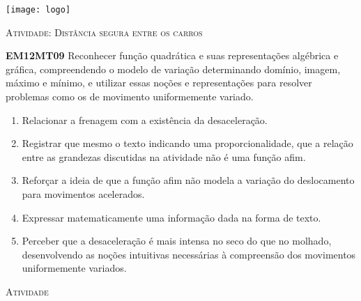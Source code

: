 \documentclass[10 pt,usenames,dvipsnames, oneside]{article}
\begin{document}
\begin{center}
  \begin{minipage}[l]{3cm}
\texttt{[image: logo]}    
\end{minipage}\hfill
\begin{minipage}[r]{.8\textwidth}
 {\Large \scshape Atividade: Distância segura entre os carros}  
\end{minipage}
\end{center}
\vspace{.2cm}

\ifdefined\prof
\begin{objetivos}
\item \textbf{EM12MT09} Reconhecer função quadrática e suas representações algébrica e gráfica, compreendendo o
modelo de variação determinando domínio, imagem, máximo e mínimo, e utilizar essas noções e
representações para resolver problemas como os de movimento uniformemente variado.
\end{objetivos}

\begin{goals}
\begin{enumerate}
\item Relacionar a frenagem com a existência da desaceleração.
\item Registrar que mesmo o texto indicando uma proporcionalidade, que a relação entre as grandezas discutidas na atividade não é uma função afim.
\item Reforçar a ideia de que a função afim não modela a variação do deslocamento para movimentos acelerados.
\item Expressar matematicamente uma informação dada na forma de texto.
\item Perceber que a desaceleração é mais intensa no seco do que no molhado, desenvolvendo as noções intuitivas necessárias à compreensão dos movimentos uniformemente variados.
\end{enumerate}


\end{goals}

\bigskip
\begin{center}
{\large \scshape Atividade}
\end{center}
\fi
\end{document}
